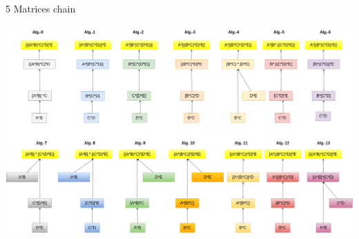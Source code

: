 \documentclass[10pts]{beamer}
\begin{document}
	 	
	 	
	 	\begin{frame}{5 Matrices chain}
	 	    \begin{center}
	 		\includegraphics[scale =0.23]{5mat_color_black_Arrow.png}
	 		\end{center}
	 	\end{frame}
	 	
	 
\end{document}

